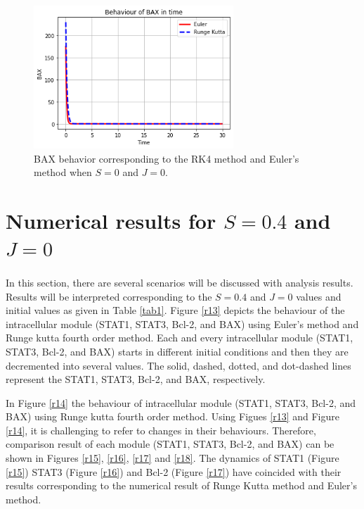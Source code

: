 \begin{figure}[hbt!]
	\centering
	\begin{framed}
	\includegraphics[width=0.67\textwidth]{Figures/A/N6.png}
		\end{framed}
	\caption{BAX behavior corresponding to the RK4 method and Euler's method  when $S =0$ and $J=0$.}
	\label{r6}
\end{figure}





\section{Numerical results for $S =0.4$ and $J=0$}
\paragraph{}
 
In this section, there are several scenarios will be discussed with analysis results. Results will be interpreted corresponding to the $S =0.4$ and $J=0$  values and initial values as given in Table \ref{tab1}. Figure \ref{r13} depicts the behaviour of the intracellular module (STAT1, STAT3, Bcl-2, and BAX) using Euler's method and Runge kutta fourth order method. Each and every intracellular module (STAT1, STAT3, Bcl-2, and BAX) starts in different initial conditions and then they are decremented into several values. The solid, dashed, dotted, and dot-dashed lines represent the STAT1, STAT3, Bcl-2, and BAX, respectively. 

In Figure \ref{r14} the behaviour of intracellular module (STAT1, STAT3, Bcl-2, and BAX) using Runge kutta fourth order method. Using Figues \ref{r13} and Figure \ref{r14}, it is challenging to refer to changes in their behaviours. Therefore, comparison result of each module (STAT1, STAT3, Bcl-2, and BAX) can be shown in Figures \ref{r15}, \ref{r16}, \ref{r17} and \ref{r18}. The dynamics of STAT1  (Figure \ref{r15}) STAT3  (Figure \ref{r16}) and Bcl-2 (Figure \ref{r17}) have coincided with their results corresponding to the numerical result of Runge Kutta method and Euler's method.

